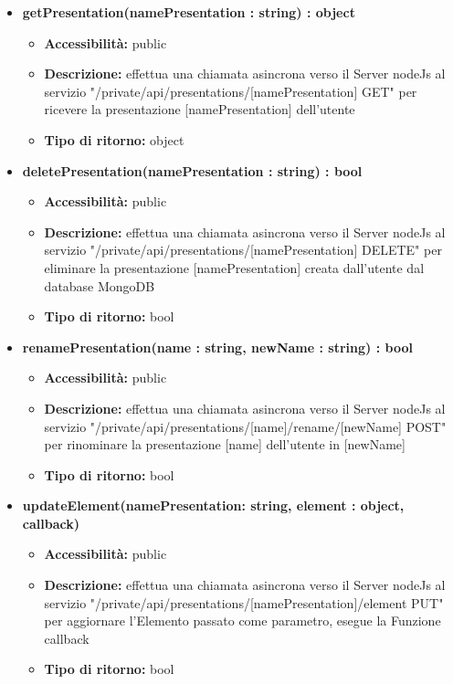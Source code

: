 {\begin{itemize}
		\item \textbf{getPresentation(namePresentation : string) : object}
			\begin{itemize}
			\item \textbf{Accessibilit\`{a}:} public
			\item \textbf{Descrizione:} effettua una chiamata asincrona verso il Server nodeJs al servizio "/private/api/presentations/[namePresentation] GET" per ricevere la presentazione [namePresentation] dell'utente
			\item \textbf{Tipo di ritorno:} object
			\end{itemize}
			
		\item \textbf{deletePresentation(namePresentation : string) : bool}
			\begin{itemize}
			\item \textbf{Accessibilit\`{a}:} public
			\item \textbf{Descrizione:} effettua una chiamata asincrona verso il Server nodeJs al servizio "/private/api/presentations/[namePresentation] DELETE" per eliminare la presentazione [namePresentation] creata dall'utente dal database MongoDB
			\item \textbf{Tipo di ritorno:} bool
			\end{itemize}
			
		\item \textbf{renamePresentation(name : string, newName : string) : bool}
			\begin{itemize}
			\item \textbf{Accessibilit\`{a}:} public
			\item \textbf{Descrizione:} effettua una chiamata asincrona verso il Server nodeJs al servizio "/private/api/presentations/[name]/rename/[newName] POST" per rinominare la presentazione [name] dell'utente in [newName] 
			\item \textbf{Tipo di ritorno:} bool
			\end{itemize}
			
		\item \textbf{updateElement(namePresentation: string, element : object, callback) }
			\begin{itemize}
			\item \textbf{Accessibilit\`{a}:} public
			\item \textbf{Descrizione:} effettua una chiamata asincrona verso il Server nodeJs al servizio "/private/api/presentations/[namePresentation]/element PUT" per aggiornare l'Elemento passato come parametro, esegue la Funzione callback
			\item \textbf{Tipo di ritorno:} bool
			\end{itemize}
			

\end{itemize}}
